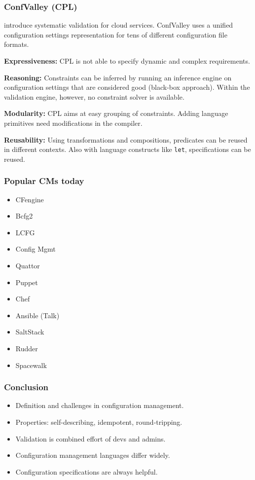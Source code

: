 \begin{frame}
	\frametitle{ConfValley (CPL)}

	\citet{huang2015confvalley} introduce systematic validation for cloud services.
	ConfValley uses a unified configuration settings representation for tens of different configuration file formats.

	\textbf{Expressiveness:}
	CPL is not able to specify dynamic and complex requirements.

	\textbf{Reasoning:}
	Constraints can be inferred by running an inference engine on configuration settings that are considered good (black-box approach).
	Within the validation engine, however, no constraint solver is available.

	\textbf{Modularity:}
	CPL aims at easy grouping of constraints.
	Adding language primitives need modifications in the compiler.

	\textbf{Reusability:}
	Using transformations and compositions, predicates can be reused in different contexts.
	Also with language constructs like \texttt{let}, specifications can be reused.
\end{frame}

\begin{frame}
	\frametitle{Popular CMs today}

	\begin{itemize}[<+-| alert@+>]
	\item CFengine
	\item Bcfg2
	\item LCFG
	\item Config Mgmt
	\item Quattor
	\item Puppet
	\item Chef
	\item Ansible (Talk)
	\item SaltStack
	\item Rudder
	\item Spacewalk
	\end{itemize}
\end{frame}


\begin{frame}
	\frametitle{Conclusion}

	\begin{itemize}[<+-| alert@+>]
	\item Definition and challenges in configuration management.
	\item Properties: self-describing, idempotent, round-tripping.
	\item Validation is combined effort of devs and admins.
	\item Configuration management languages differ widely.
	\item Configuration specifications are always helpful.
	\end{itemize}
\end{frame}




\nocite{raab2017introducing}

\appendix

\begin{frame}[allowframebreaks]
	
	
\end{frame}





